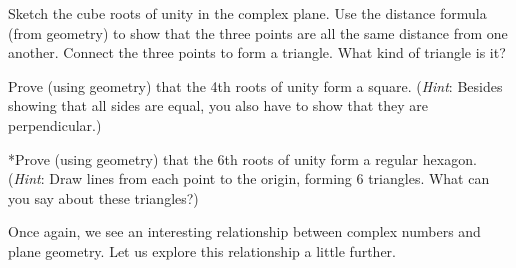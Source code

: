 \begin{exercise}{52}
Sketch the cube roots of unity in the complex plane. Use the distance formula (from geometry) to show that the three points are all the same distance from one another.  Connect the three points to form a triangle. What kind of triangle is it?
\end{exercise}

\begin{exercise}{53}
Prove (using geometry) that the 4th roots of unity form a square. (\emph{Hint}: Besides showing that all sides are equal, you also have to show that they are perpendicular.)
\end{exercise}

\begin{exercise}{54}
*Prove (using geometry) that the 6th roots of unity form a regular hexagon. (\emph{Hint}: Draw lines from each point to the origin, forming 6 triangles. What can you say about these triangles?)
\end{exercise}

Once again, we see an interesting relationship between complex numbers and plane geometry.  Let us explore this relationship a little further.

